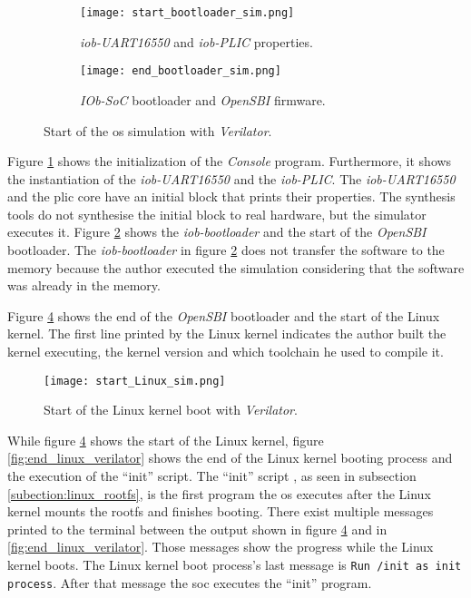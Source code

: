 \begin{figure}[!ht]
    \centering
    \begin{subfigure}[b]{0.49\textwidth}
        \centering
        \texttt{[image: start\_bootloader\_sim.png]}
        \caption{\textit{iob-UART16550} and \textit{iob-PLIC} properties.}
        \label{fig:start_bootloader_sim}
    \end{subfigure}
    \hfill
    \begin{subfigure}[b]{0.49\textwidth}
        \centering
        \texttt{[image: end\_bootloader\_sim.png]}
        \caption{\textit{IOb-SoC} bootloader and \textit{OpenSBI} firmware.}
        \label{fig:end_bootloader_sim}
    \end{subfigure}
    \caption{Start of the \acrshort{os} simulation with \textit{Verilator}.}
    \label{fig:bootloader_sim}
\end{figure}

Figure \ref{fig:start_bootloader_sim} shows the initialization of the \textit{Console} program. Furthermore, it shows the instantiation of the \textit{iob-UART16550} and the \textit{iob-PLIC}. The \textit{iob-UART16550} and the \acrshort{plic} core have an initial block that prints their properties. The synthesis tools do not synthesise the initial block to real hardware, but the simulator executes it. Figure \ref{fig:end_bootloader_sim} shows the \textit{iob-bootloader} and the start of the \textit{OpenSBI} bootloader. The \textit{iob-bootloader} in figure \ref{fig:end_bootloader_sim} does not transfer the software to the memory because the author executed the simulation considering that the software was already in the memory.

Figure \ref{fig:start_linux_sim} shows the end of the \textit{OpenSBI} bootloader and the start of the Linux kernel. The first line printed by the Linux kernel indicates the author built the kernel executing, the kernel version and which toolchain he used to compile it.

\begin{figure}[!ht]
    \centering
    \centering
    \texttt{[image: start\_Linux\_sim.png]}
    \caption{Start of the Linux kernel boot with \textit{Verilator}.}
    \label{fig:start_linux_sim}
\end{figure}

While figure \ref{fig:start_linux_sim} shows the start of the Linux kernel, figure \ref{fig:end_linux_verilator} shows the end of the Linux kernel booting process and the execution of the \enquote{init} script. The \enquote{init} script , as seen in subsection \ref{subection:linux_rootfs}, is the first program the \acrshort{os} executes after the Linux kernel mounts the \acrshort{rootfs} and finishes booting. There exist multiple messages printed to the terminal between the output shown in figure \ref{fig:start_linux_sim} and in \ref{fig:end_linux_verilator}. Those messages show the progress while the Linux kernel boots. The Linux kernel boot process's last message is \lstinline{Run /init as init process}. After that message the \acrshort{soc} executes the \enquote{init} program.

